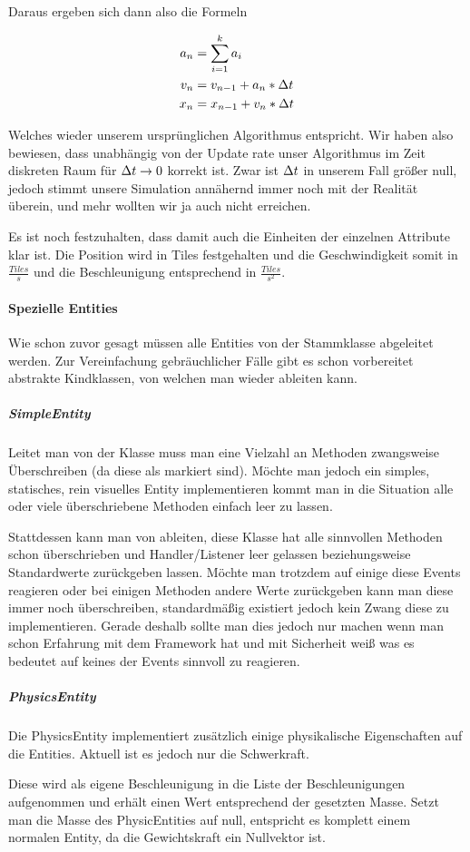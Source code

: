 Daraus ergeben sich dann also die Formeln

\begin{align*}
  a_n &= \sum_{i=1}^{k}{a_i}  \\
  v_n &= v_{n-1} + a_n * \Delta t  \\
  x_n &= x_{n-1} + v_n * \Delta t
\end{align*}

Welches wieder unserem ursprünglichen Algorithmus entspricht. Wir haben also bewiesen, dass unabhängig von der Update rate unser Algorithmus im Zeit diskreten Raum für $\Delta t \rightarrow 0$ korrekt ist. Zwar ist $\Delta t $ in unserem Fall größer null, jedoch stimmt unsere Simulation annähernd immer noch mit der Realität überein, und mehr wollten wir ja auch nicht erreichen.

Es ist noch festzuhalten, dass damit auch die Einheiten der einzelnen Attribute klar ist. Die Position wird in Tiles festgehalten und die Geschwindigkeit somit in $\frac{Tiles}{s}$ und die Beschleunigung entsprechend in $\frac{Tiles}{s^2}$.

\paragraph{Spezielle Entities}

Wie schon zuvor gesagt müssen alle Entities von der Stammklasse  abgeleitet werden. Zur Vereinfachung gebräuchlicher Fälle gibt es schon vorbereitet abstrakte Kindklassen, von welchen man wieder ableiten kann.


\subparagraph{SimpleEntity}

Leitet man von der Klasse  muss man eine Vielzahl an Methoden zwangsweise Überschreiben (da diese als  markiert sind). Möchte man jedoch ein simples, statisches, rein visuelles Entity implementieren kommt man in die Situation alle oder viele überschriebene Methoden einfach leer zu lassen.

Stattdessen kann man von  ableiten, diese Klasse hat alle sinnvollen Methoden schon überschrieben und Handler/Listener leer gelassen beziehungsweise Standardwerte zurückgeben lassen. Möchte man trotzdem auf einige diese Events reagieren oder bei einigen Methoden andere Werte zurückgeben kann man diese immer noch überschreiben, standardmäßig existiert jedoch kein Zwang diese zu implementieren.
Gerade deshalb sollte man dies jedoch nur machen wenn man schon Erfahrung mit dem Framework hat und mit Sicherheit weiß was es bedeutet auf keines der Events sinnvoll zu reagieren.

\subparagraph{PhysicsEntity}

Die PhysicsEntity implementiert zusätzlich einige physikalische Eigenschaften auf die Entities. Aktuell ist es jedoch nur die Schwerkraft.

Diese wird als eigene Beschleunigung in die Liste der Beschleunigungen aufgenommen und erhält einen Wert entsprechend der gesetzten Masse. Setzt man die Masse des PhysicEntities auf null, entspricht es komplett einem normalen Entity, da die Gewichtskraft ein Nullvektor ist.
